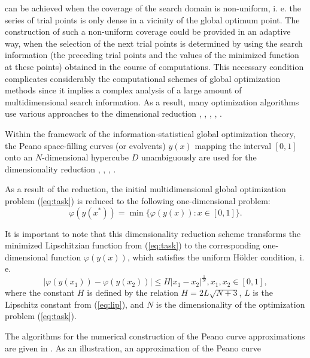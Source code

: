 \documentclass{naco}
\theoremstyle{definition}
\begin{document}
can be achieved when the coverage of the search domain is non-uniform, i. e. the series
of trial points is only dense in a vicinity of the global optimum point. The construction
of such a non-uniform coverage could be provided in an adaptive way, when the selection
of the next trial points is determined by using the search information (the preceding
trial points and the values of the minimized function at these points) obtained in the course
of computations. This necessary condition complicates considerably the computational schemes
of global optimization methods since it implies a complex analysis of a large amount
of multidimensional search information. As a result, many optimization algorithms use
various approaches to the dimensional reduction \cite{pinterGO}, \cite{sergeyevStronginLera2013}, \cite{strongin1978}, \cite{stronginGergelBarkalovParGO}, \cite{strSergGO}.
\par
Within the framework of the information-statistical global optimization theory,
the Peano space-filling curves (or evolvents) \(y(x)\) mapping the interval \([0,1]\)
onto an \(N\)-dimensional hypercube \(D\) unambiguously are used for the dimensionality
reduction \cite{sergeyevStronginLera2013}, \cite{strongin1978}, \cite{stronginGergelBarkalovParGO}, \cite{strSergGO}.
\par
As a result of the reduction, the initial multidimensional global optimization
problem (\ref{eq:task}) is reduced to the following one-dimensional problem:
\begin{equation}
\label{eq:oneDimTask}
\varphi(y(x^*))=\min\{\varphi(y(x)):x\in [0,1]\}.
\end{equation}
\par
It is important to note that this dimensionality reduction scheme transforms the minimized
Lipschitzian function from (\ref{eq:task}) to the corresponding one-dimensional
function \(\varphi(y(x))\), which satisfies the uniform H{\"o}lder condition, i. e.
\begin{equation}
\label{eq:holder}
|\varphi(y(x_1))-\varphi(y(x_2))|\leq H{|x_1-x_2|}^{\frac{1}{N}}, x_1,x_2\in[0,1],
\end{equation}
where the constant $H$ is defined by the relation \(H=2L\sqrt{N+3}\), \(L\) is the Lipschitz
constant from (\ref{eq:lip}), and \(N\) is the dimensionality of the optimization problem (\ref{eq:task}).
\par
The algorithms for the numerical construction of the Peano curve approximations are
given in \cite{strSergGO}. As an illustration, an approximation of the Peano curve
\end{document}
